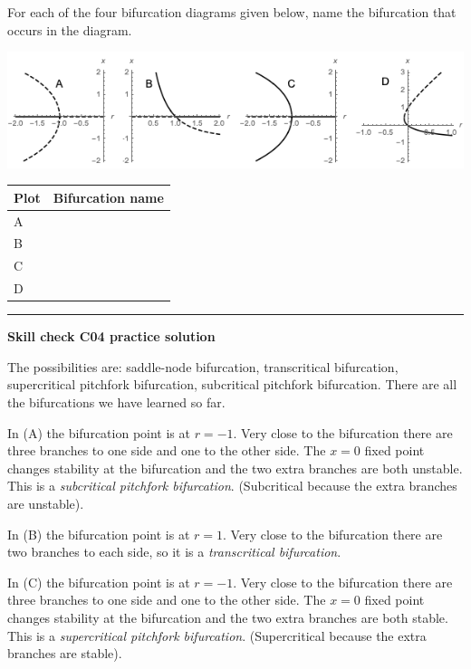 \documentclass[12pt,letterpaper,noanswers]{exam}
\begin{document}
\begin{questions}
\item For each of the four bifurcation diagrams given below, name the bifurcation that occurs in the diagram.

\includegraphics[width=\linewidth]{img/C04-2019-09-11bifn.png}


\bgroup
\def\arraystretch{2}
\begin{tabular}{|l|p{10cm}|}
\hline
Plot     & \hspace{0.5cm} Bifurcation name \\
\hline\hline
 A    & \\
 \hline
 B & \\
 \hline
 C & \\
 \hline
 D & \\
 \hline
\end{tabular}
\egroup
\end{questions}

\vspace{0.2cm}
\hrule
\vspace{0.2cm}
\noindent\textbf{Skill check C04 practice solution} 

The possibilities are: saddle-node bifurcation, transcritical bifurcation, supercritical pitchfork bifurcation, subcritical pitchfork bifurcation.  There are all the bifurcations we have learned so far.

In (A) the bifurcation point is at $r = -1$.  Very close to the bifurcation there are three branches to one side and one to the other side.  The $x=0$ fixed point changes stability at the bifurcation and the two extra branches are both unstable.  This is a \emph{subcritical pitchfork bifurcation}.  (Subcritical because the extra branches are unstable).

In (B) the bifurcation point is at $r = 1$.  Very close to the bifurcation there are two branches to each side, so it is a \emph{transcritical bifurcation}.

In (C) the bifurcation point is at $r = -1$.  Very close to the bifurcation there are three branches to one side and one to the other side.  The $x=0$ fixed point changes stability at the bifurcation and the two extra branches are both stable.  This is a \emph{supercritical pitchfork bifurcation}.  (Supercritical because the extra branches are stable).
\end{document}

